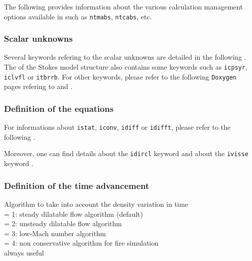 The following 
provides information about the various calculation management options available
in \CS such as \texttt{ntmabs}, \texttt{ntcabs}, etc.

\subsubsection{Scalar unknowns}

Several keywords refering to the scalar unknowns are
detailed in the following
. The 
of the Stokes model structure also contains some keywords such as \texttt{icpsyr},
\texttt{iclvfl} or \texttt{itbrrb}.
For other keywords, please refer to the following \texttt{Doxygen} pages refering to
 and
.

\subsubsection{Definition of the equations}

For informations about \texttt{istat}, \texttt{iconv}, \texttt{idiff}
or \texttt{idifft}, please refer to the following
.

Moreover, one can find details about the \texttt{idircl} keyword
 and about the
\texttt{ivisse} keyword .

\subsubsection{Definition of the time advancement}

{Algorithm to take into account the density variation in time\\
\hspace*{1.3cm}= 1: steady dilatable flow algorithm (default)\\
\hspace*{1.3cm}= 2: unsteady dilatable flow algorithm\\
\hspace*{1.3cm}= 3: low-Mach number algorithm\\
\hspace*{1.3cm}= 4: non conservative algorithm for fire simulation\\
always useful}

